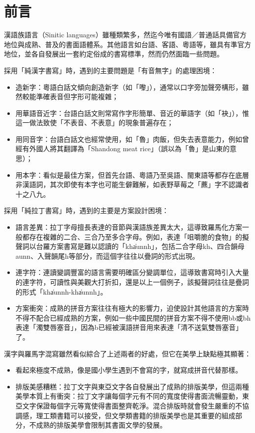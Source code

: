 \section*{前言}

漢語族語言（Sinitic languages）雖種類繁多，然迄今唯有國語／普通話具備官方地位與成熟、普及的書面語體系。其他語言如台語、客語、粵語等，雖具有準官方地位，並各自發展出一套約定俗成的書寫標準，然而仍然面臨一些問題。\par
採用「純漢字書寫」時，遇到的主要問題是「有音無字」的處理困境：\par
\begin{itemize}
	\item 造新字：粵語白話文傾向創造新字（如「嚟」），通常以口字旁加聲旁構形，雖然較能準確表音但字形可能複雜；
	\item 用華語音近字：台語白話文則常寫作字形簡單、音近的華語字（如「袂」），惟這一做法致使「不表音、不表意」的現象普遍存在；
	\item 用同音字：台語白話文也經常使用，如「魯」肉飯，但失去表意能力，例如曾經有外國人將其翻譯為「Shandong meat rice」（誤以為「魯」是山東的意思）；
	\item 用本字：看似是最佳方案，但首先台語、粵語乃至吳語、閩東語等都存在底層非漢語詞，其次即使有本字也可能生僻難解，如表野草莓之「藨」字不認識者十之八九。
\end{itemize}
採用「純拉丁書寫」時，遇到的主要是方案設計困境：\par
\begin{itemize}
	\item 語言差異：拉丁字母擅長表達的音節與漢語族差異太大，這導致羅馬化方案一般都存在複雜的二合、三合乃至多合字母。例如，表達「咀嚼脆的食物」的擬聲詞以台羅方案書寫是難以認讀的「kha̍unnh」，包括二合字母kh、四合韻母aunn、入聲韻尾h等部分，而這個字往往以疊詞的形式出現。
	\item 連字符：連讀變調豐富的語言需要明確區分變調單位，這導致書寫時引入大量的連字符，可讀性與美觀大打折扣，還是以上一個例子，該擬聲詞往往是疊詞的形式「kha̍unnh-kha̍unnh」。
	\item 方案衝突：成熟的拼音方案往往有極大的影響力，迫使設計其他語言的方案時不得不配合已經成熟的方案，例如一些中國民間的拼音方案不得不使用bb或bh表達「濁雙唇塞音」，因為b已經被漢語拼音用來表達「清不送氣雙唇塞音」了。
\end{itemize}

漢字與羅馬字混寫雖然看似綜合了上述兩者的好處，但它在美學上缺點極其顯著：
\begin{itemize}
	\item 看起來極度不成熟，像是國小學生遇到不會寫的字，就寫成拼音代替那樣。
	\item 排版美感糟糕：拉丁文字與東亞文字各自發展出了成熟的排版美學，但這兩種美學本質上有衝突：拉丁文字讓每個字元有不同的寬度使得書面流暢靈動，東亞文字保證每個字元等寬使得書面整齊乾淨。混合排版時就會發生嚴重的不協調感，理工類書籍可以接受，但文學類書籍的排版美學也是其重要的組成部分，不成熟的排版美學會限制其書面文學的發展。
\end{itemize}


